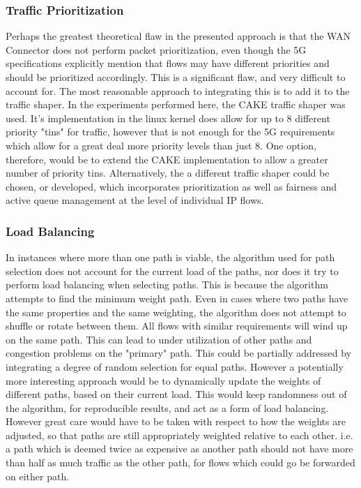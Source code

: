 \subsubsection{Traffic Prioritization}

Perhaps the greatest theoretical flaw in the presented approach is that the WAN Connector does not perform packet prioritization, even though the 5G specifications explicitly mention that flows may have different priorities and should be prioritized accordingly. This is a significant flaw, and very difficult to account for. The most reasonable approach to integrating this is to add it to the traffic shaper. In the experiments performed here, the CAKE traffic shaper was used. It's implementation in the linux kernel does allow for up to 8 different priority 
"tins" for traffic, however that is not enough for the 5G requirements which allow for a great deal more priority levels than just 8. One option, therefore, would be to extend the CAKE implementation to allow a greater number of priority tins. Alternatively, the a different traffic shaper could be chosen, or developed, which incorporates prioritization as well as fairness and active queue management at the level of individual IP flows.


\subsubsection{Load Balancing}

In instances where more than one path is viable, the algorithm used for path selection does not account for the current load of the paths, nor does it try to perform load balancing when selecting paths. This is because the algorithm attempts to find the minimum weight path. Even in cases where two paths have the same properties and the same weighting, the algorithm does not attempt to shuffle or rotate between them. All flows with similar requirements will wind up on the same path. This can lead to under utilization of other paths and congestion problems on the "primary" path. This could be partially addressed by integrating a degree of random selection for equal paths. However a potentially more interesting approach would be to dynamically update the weights of different paths, based on their current load. This would keep randomness out of the algorithm, for reproducible results, and act as a form of load balancing. However great care would have to be taken with respect to how the weights are adjusted, so that paths are still appropriately weighted relative to each other. i.e. a path which is deemed twice as expensive as another path should not have more than half as much traffic as the other path, for flows which could go be forwarded on either path.















